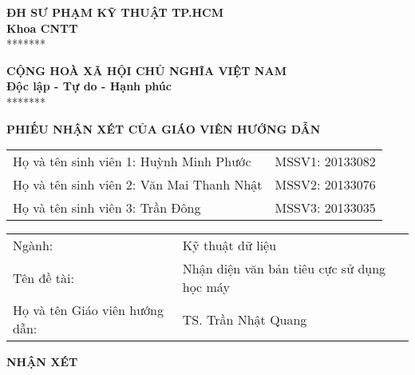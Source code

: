
\noindent\begin{minipage}[t]{0.42\textwidth}
    \centering
    \fontsize{11pt}{16.5pt}
    \textbf{ĐH SƯ PHẠM KỸ THUẬT TP.HCM}\\
    \textbf{Khoa CNTT}\\
    *******
\end{minipage}
\begin{minipage}[t]{0.57\textwidth}
    \centering
    \fontsize{11pt}{16.5pt}
    \textbf{CỘNG HOÀ XÃ HỘI CHỦ NGHĨA VIỆT NAM}\\
    \textbf{Độc lập - Tự do - Hạnh phúc}\\
    *******
\end{minipage}
\begin{center}
    \fontsize{18pt}{27pt}
    \textbf{PHIẾU NHẬN XÉT CỦA GIÁO VIÊN HƯỚNG DẪN}
\end{center}
\begin{table}[!h]
    \centering
    \begin{tabularx}{0.8\textwidth}{ X c }
        Họ và tên sinh viên 1: Huỳnh Minh Phước   & MSSV1: 20133082 \\
        Họ và tên sinh viên 2: Văn Mai Thanh Nhật & MSSV2: 20133076 \\
        Họ và tên sinh viên 3: Trần Đông          & MSSV3: 20133035 \\
    \end{tabularx}
\end{table}
\begin{center}
    \begin{tabular}{p{} p{}}
        Ngành:                         & Kỹ thuật dữ liệu                           \\
        Tên đề tài:                    & Nhận diện văn bản tiêu cực sử dụng học máy \\
        Họ và tên Giáo viên hướng dẫn: & TS. Trần Nhật Quang
    \end{tabular}
\end{center}
\textbf{NHẬN XÉT}
